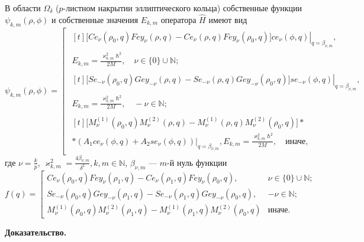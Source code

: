 \begin{theorem}
В области $\Omega_\delta$ ($p$-листном накрытии эллиптического кольца) собственные функции $\psi_{k, m}(\rho, \phi)$ и собственные значения $E_{k,m}$ оператора $\hat{H}$ имеют вид
{\small
\begin{equation}
\psi_{k,m}(\rho,\phi) = 
\left[ 
\begin{array}{cll}

\begin{multlined}[t]
    \left.
    \biggl[ Ce_\nu(\rho_0, q) Fey_\nu(\rho, q) - Ce_\nu(\rho, q) Fey_\nu(\rho_0, q) \biggr] ce_\nu(\phi, q)
    \right|_{q=\beta_{\nu, m}}, \\
    E_{k,m}= \frac{\varkappa^2_{k,m}\hbar^2}{2M}, \quad \nu \in \{0\} \cup \mathbb{N} ;
\end{multlined}
\\
\begin{multlined}[t]
    \left.
    \biggl[ Se_{-\nu}(\rho_0, q) Gey_{-\nu}(\rho, q) - Se_{-\nu}(\rho, q) Gey_{-\nu}(\rho_0, q) \biggr] se_{-\nu}(\phi, q)
    \right|_{q=\beta_{\nu, m}}, \\
    E_{k,m}= \frac{\varkappa^2_{k,m}\hbar^2}{2M},  \quad -\nu \in \mathbb{N} ;
\end{multlined}
\\
\begin{multlined}[t]
\biggl[ M_\nu^{(1)}(\rho_0, q) M_\nu^{(2)}(\rho, q) - M_\nu^{(1)}(\rho, q) M_\nu^{(2)}(\rho_0, q) \biggr] * \\ 
* \left. (A_1 ce_\nu(\phi, q) + A_2 se_\nu(\phi, q)) \right|_{q=\beta_{\nu, m}}, E_{k,m}= \frac{\varkappa^2_{k,m}\hbar^2}{2M}, \quad \text{иначе},
\end{multlined}
\end{array}
\right.
\label{eq:funcRing}
\end{equation}
где $\nu=\frac{k}{p}$,  
$\varkappa^2_{k,m}=\frac{4 \beta_{\nu, m}}{\delta^2},  k, m \in \mathbb{N}$, 
$\beta_{\nu, m}$ --- $m$-й нуль функции 
\begin{equation}
f(q)= 
\left[ \begin{array}{ccc}
Ce_\nu(\rho_0, q) Fey_\nu(\rho_1, q) - Ce_\nu(\rho_1, q) Fey_\nu(\rho_0, q), & \nu \in \{0\} \cup \mathbb{N}; \\
Se_{-\nu}(\rho_0, q) Gey_{-\nu}(\rho_1, q) - Se_{-\nu}(\rho_1, q) Gey_{-\nu}(\rho_0, q), & -\nu \in \mathbb{N}; \\
M_\nu^{(1)}(\rho_0, q) M_\nu^{(2)}(\rho_1, q) - M_\nu^{(1)}(\rho_1, q) M_\nu^{(2)}(\rho_0, q) & \text{иначе}.
\end{array}
\right.
\label{eq:funcF}
\end{equation}
}

\label{th:sect2_th3}
\end{theorem}
\textbf{Доказательство.}

